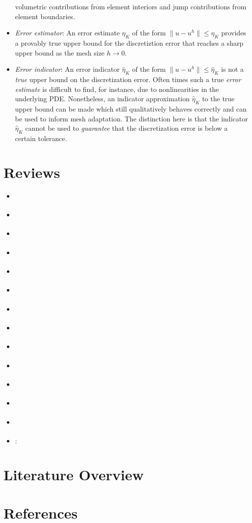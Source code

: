 \documentclass{article}
\begin{document}
\begin{itemize}
volumetric contributions from element interiors and jump contributions from
element boundaries.
\item \emph{Error estimator}: An error estimate $\eta_K$ of the form
$\| u - u^h \| \leq \eta_K$ provides a provably true upper bound for the
discretiztion error that reaches a sharp upper bound as the mesh size
$h \to 0$.
\item \emph{Error indicator}: An error indicator $\hat{\eta}_K$ of the
form $\| u - u^h \| \leq \hat{\eta}_K$ is not a \emph{true} upper bound
on the discretization error. Often times such a true \emph{error estimate}
is difficult to find, for instance, due to nonlinearities in the
underlying PDE. Nonetheless, an indicator approximation $\hat{\eta}_K$
to the true upper bound can be made which still qualitatively behaves
correctly and can be used to inform mesh adaptation. The distinction here
is that the indicator $\hat{\eta}_K$ cannot be used to \emph{guarantee}
that the discretization error is below a certain tolerance.
\end{itemize}

\section{Reviews}

\begin{itemize}
\item \cite{radovitzky1999error}
\item \cite{boussetta2006adaptive}
\item \cite{diez2000adaptivity}
\item \cite{ladeveze2003estimation}
\item \cite{verdugo2014error}
\item \cite{biotteau2012three}
\item \cite{combe2002discretization}
\item \cite{scovazzi2016simple}
\item \cite{molinari2002three}
\item \cite{luo2009adaptive}
\item \cite{lahiri2010variationally}
\item \cite{masud2013framework}
\item \cite{radovitzky1999error}
\item \cite{rodríguez2000error}:
\end{itemize}

\section{Literature Overview}

\section{References}



\end{document}
